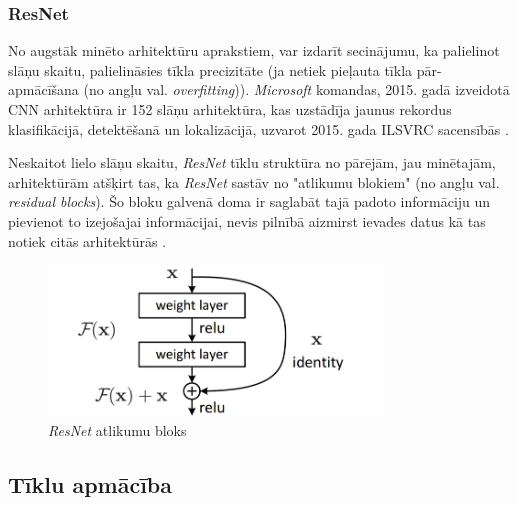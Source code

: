 \subsubsection{ResNet}
No augstāk minēto arhitektūru aprakstiem, var izdarīt secinājumu, ka palielinot slāņu skaitu, palielināsies tīkla precizitāte (ja netiek pieļauta tīkla pār-apmācīšana (no angļu val. \textit{overfitting})). \textit{Microsoft} komandas, 2015. gadā izveidotā CNN arhitektūra ir 152 slāņu arhitektūra, kas uzstādīja jaunus rekordus klasifikācijā, detektēšanā un lokalizācijā, uzvarot 2015. gada ILSVRC sacensībās \cite{ILSVRC15}. 

Neskaitot lielo slāņu skaitu, \textit{ResNet} tīklu struktūra no pārējām, jau minētajām, arhitektūrām atšķirt tas, ka \textit{ResNet} sastāv no "atlikumu blokiem" (no angļu val. \textit{residual blocks}). Šo bloku galvenā doma ir saglabāt tajā padoto informāciju un pievienot to izejošajai informācijai, nevis pilnībā aizmirst ievades datus kā tas notiek citās arhitektūrās \cite{he2016deep}. 

\begin{figure}[h]%
	\centering
	\includegraphics[height=4cm]{images/resnet.png} %
	\caption{\textit{ResNet} atlikumu bloks \cite{he2016deep}}%
	\label{fig:example}%
\end{figure}
\subsection{Tīklu apmācība}
